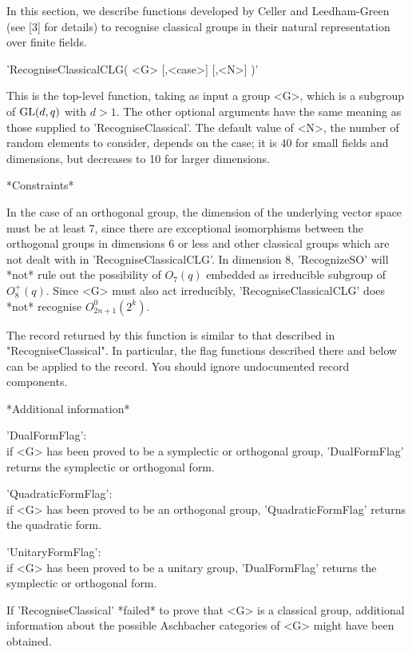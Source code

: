 

In this  section,    we  describe functions developed   by    Celler and
Leedham-Green (see [3]  for  details) to  recognise  classical groups  in
their natural representation over finite fields.

'RecogniseClassicalCLG( <G> [,<case>] [,<N>] )'

This is the top-level function, taking  as input a  group <G>, which is a
subgroup of ${\rm GL}(d,q)$  with $d > 1$.   The other optional arguments have
the same meaning as  those supplied to 'RecogniseClassical'.  The default
value of <N>, the  number of random  elements to consider, depends on the
case; it is 40 for  small fields and dimensions,  but decreases to 10 for
larger dimensions.

*Constraints*

In  the case  of  an orthogonal  group,  the dimension  of the underlying
vector space must be at least 7, since there are exceptional isomorphisms
between  the  orthogonal  groups  in dimensions  $6$   or less and  other
classical  groups which are  not dealt with in 'RecogniseClassical\-CLG'.
In  dimension $8$, 'RecognizeSO' will *not*  rule out  the possibility of
$O_7(q)$ embedded as irreducible subgroup of  $O_8^+(q)$.  Since <G> must
also act    irreducibly, 'RecogniseClassicalCLG'  does  *not*   recognise
$O_{2n+1}^0(2^k)$.

The record  returned by  this function  is similar to  that  described in
"RecogniseClassical".  In particular,  the flag functions described there
and below can  be applied to the record.   You should ignore undocumented
record components.

*Additional information*

'DualFormFlag':\\
    if  <G>  has been proved to be  a  symplectic  or  orthogonal group,
    'DualFormFlag' returns the symplectic or orthogonal form.

'QuadraticFormFlag':\\
    if <G> has been proved to  be an orthogonal group, 'QuadraticFormFlag'
    returns the quadratic form.

'UnitaryFormFlag':\\
    if <G> has been proved to be a unitary group, 'DualFormFlag' returns
    the symplectic or orthogonal form.

If 'RecogniseClassical' *failed* to prove  that <G> is a classical group,
additional information about the   possible Aschbacher categories of  <G>
might have been obtained.

